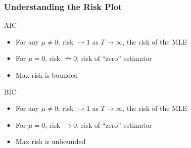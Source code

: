 \begin{frame}
  \frametitle{Understanding the Risk Plot}

\begin{block}{AIC}
  \begin{itemize}
    \item For any $\mu \neq 0$, risk $\rightarrow 1$ as $T\rightarrow \infty$, the risk of the MLE
    \item For $\mu = 0$, risk $\nrightarrow 0$, risk of ``zero'' estimator 
    \item Max risk is bounded
  \end{itemize}
\end{block}

\begin{block}{BIC}
  \begin{itemize}
    \item For any $\mu \neq 0$, risk $\rightarrow 1$ as $T\rightarrow \infty$, the risk of the MLE
    \item For $\mu = 0$, risk $\rightarrow 0$, risk of ``zero'' estimator 
    \item Max risk is unbounded
  \end{itemize}
\end{block}

\end{frame}

